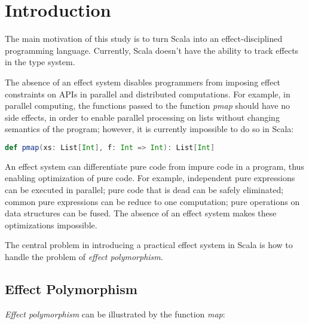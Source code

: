 \section{Introduction}




The main motivation of this study is to turn Scala into an
effect-disciplined programming language. Currently, Scala doesn't have
the ability to track effects in the type system.

The absence of an effect system disables programmers from imposing
effect constraints on APIs in parallel and distributed
computations. For example, in parallel computing, the functions passed
to the function \emph{pmap} should have no side effects, in order to
enable parallel processing on lists without changing semantics of the
program; however, it is currently impossible to do so in Scala:

\begin{lstlisting}[language=Scala]
def pmap(xs: List[Int], f: Int => Int): List[Int]
\end{lstlisting}

An effect system can differentiate pure code from impure code in a
program, thus enabling optimization of pure code. For example,
independent pure expressions can be executed in parallel; pure code
that is dead can be safely eliminated; common pure expressions can be
reduce to one computation; pure operations on data structures can be
fused\cite{coutts2007stream}. The absence of an effect system makes
these optimizations impossible.

The central problem in introducing a practical effect system in Scala
is how to handle the problem of \emph{effect polymorphism}.

\subsection{Effect Polymorphism}

\emph{Effect polymorphism} can be illustrated by the
function \emph{map}:

